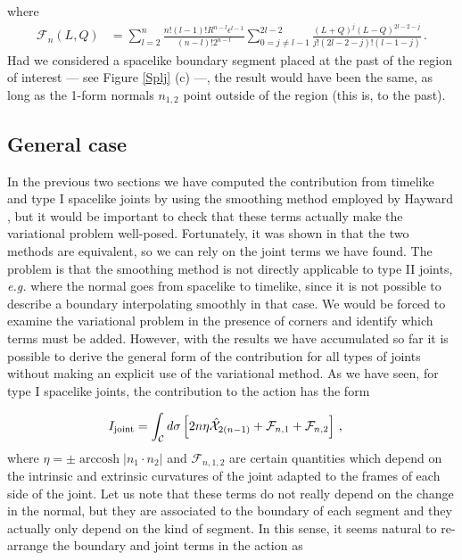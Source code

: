 \documentclass[11pt,letterpaper]{article}
\begin{document}
where
\begin{equation}\label{Fnsp}
\begin{aligned}
\mathcal{F}_n(L, Q)&= \sum_{l=2}^{n}\frac{n!(l-1)! R^{n-l}\epsilon^{l-1}}{(n-l)!2^{n-l}}\sum_{0=j\neq l-1}^{2l-2}\frac{(L+ Q)^j(L-Q)^{2l-2-j}}{j!(2l-2-j)!(l-1-j)}\, .\end{aligned}
\end{equation}
Had we considered a spacelike boundary segment placed at the past of the region of interest --- see Figure \ref{Splj} (c) ---, the result would have been the same, as long as the 1-form normals $n_{1,2}$ point outside of the region (this is, to the past). 

 \subsection{General case}\label{24}
In the previous two sections we have computed the contribution from timelike and type I spacelike joints by using the smoothing method employed by Hayward \cite{Hayward:1993my}, but it would be important to check that these terms actually make the variational problem well-posed. Fortunately, it was shown in \cite{Ruan:2017tkr} that the two methods are equivalent, so we can rely on the joint terms we have found.
The problem is that the smoothing method is not directly applicable to type II joints, \textit{e.g.} where the normal goes from spacelike to timelike, since it is not possible to describe a boundary interpolating smoothly in that case. We would be forced to examine the variational problem in the presence of corners and identify which terms must be added. However, with the results we have accumulated so far it is possible to derive the general form of the contribution for all types of joints without making an explicit use of the variational method. As we have seen, for type I spacelike joints, the contribution to the action has the form

\begin{equation}\label{Ijoint1}
\begin{aligned}
I_{\rm joint}&=\int_{\mathcal{C}}d\sigma \left[2n\eta \hat{\mathcal{X}}_{2(n-1)}+\mathcal{F}_{n, 1}+\mathcal{F}_{n,2}\right]\, ,
\end{aligned}
\end{equation}
where $\eta=\pm \operatorname{arccosh}|n_1\cdot n_2|$ and $\mathcal{F}_{n, 1,2}$ are certain quantities which depend on the intrinsic and extrinsic curvatures of the joint adapted to the frames of each side of the joint. Let us note that these terms do not really depend on the change in the normal, but they are associated to the boundary of each segment and they actually only depend on the kind of segment. In this sense, it seems natural to re-arrange the boundary and joint terms in the action as
\end{document}
